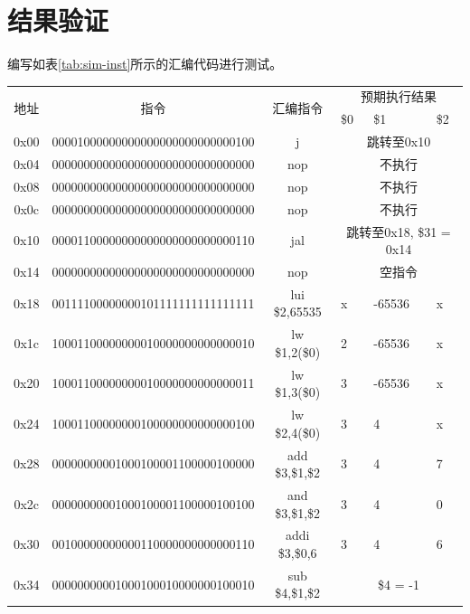 \documentclass[UTF8]{ctexart}
\begin{document}
\section{结果验证}
编写如表\ref{tab:sim-inst}所示的汇编代码进行测试。\par
\begin{longtable}[c]{|c|c|c|p{1.2cm}<{\centering}|p{1.2cm}<{\centering}|p{1.2cm}<{\centering}|}
\hline
\multirow{2}{*}{地址} & \multirow{2}{*}{指令} & \multirow{2}{*}{汇编指令} & \multicolumn{3}{c|}{预期执行结果} \\ \cline{4-6} 
    &  &  & \$0 & \$1 & \$2 \\ \hline
\endfirsthead
%
\endhead
%
0x00 & 00001000000000000000000000000100 & j & \multicolumn{3}{c|}{跳转至0x10} \\ \hline
0x04 & 00000000000000000000000000000000 & nop & \multicolumn{3}{c|}{不执行} \\ \hline
0x08 & 00000000000000000000000000000000 & nop & \multicolumn{3}{c|}{不执行} \\ \hline
0x0c & 00000000000000000000000000000000 & nop & \multicolumn{3}{c|}{不执行} \\ \hline
0x10 & 00001100000000000000000000000110 & jal & \multicolumn{3}{c|}{跳转至0x18, \$31 = 0x14} \\ \hline
0x14 & 00000000000000000000000000000000 & nop & \multicolumn{3}{c|}{空指令} \\ \hline
0x18 & 00111100000000101111111111111111 & lui \$2,65535 & x & -65536 & x \\ \hline
0x1c & 10001100000000010000000000000010 & lw \$1,2(\$0) & 2 & -65536 & x \\ \hline
0x20 & 10001100000000010000000000000011 & lw \$1,3(\$0) & 3 & -65536 & x \\ \hline
0x24 & 10001100000000100000000000000100 & lw \$2,4(\$0) & 3 & 4 & x \\ \hline
0x28 & 00000000001000100001100000100000 & add \$3,\$1,\$2 & 3 & 4 & 7 \\ \hline
0x2c & 00000000001000100001100000100100 & and \$3,\$1,\$2 & 3 & 4 & 0 \\ \hline
0x30 & 00100000000000110000000000000110 & addi \$3,\$0,6 & 3 & 4 & 6 \\ \hline
0x34 & 00000000001000100010000000100010 & sub \$4,\$1,\$2 & \multicolumn{3}{c|}{\$4 = -1} \\ \hline

\end{longtable}
\end{document}
